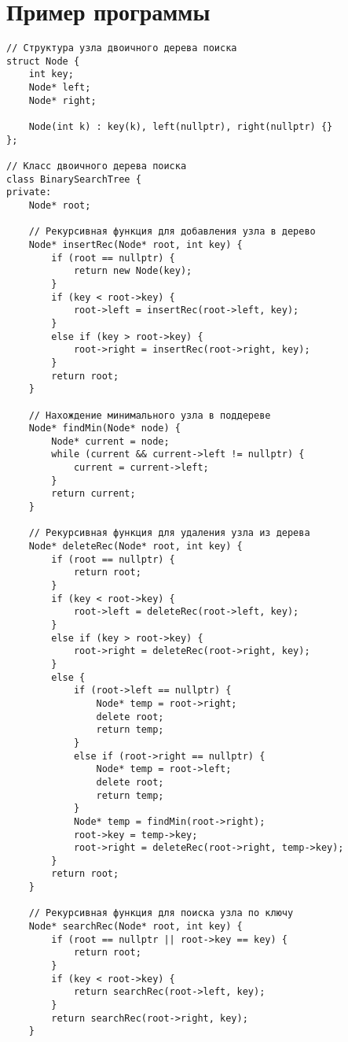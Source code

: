 \documentclass[otchet]{SCWorks}
\begin{document}
\section{Пример программы}
\begin{verbatim}
// Структура узла двоичного дерева поиска
struct Node {
    int key;
    Node* left;
    Node* right;

    Node(int k) : key(k), left(nullptr), right(nullptr) {}
};

// Класс двоичного дерева поиска
class BinarySearchTree {
private:
    Node* root;

    // Рекурсивная функция для добавления узла в дерево
    Node* insertRec(Node* root, int key) {
        if (root == nullptr) {
            return new Node(key);
        }
        if (key < root->key) {
            root->left = insertRec(root->left, key);
        }
        else if (key > root->key) {
            root->right = insertRec(root->right, key);
        }
        return root;
    }

    // Нахождение минимального узла в поддереве
    Node* findMin(Node* node) {
        Node* current = node;
        while (current && current->left != nullptr) {
            current = current->left;
        }
        return current;
    }

    // Рекурсивная функция для удаления узла из дерева
    Node* deleteRec(Node* root, int key) {
        if (root == nullptr) {
            return root;
        }
        if (key < root->key) {
            root->left = deleteRec(root->left, key);
        }
        else if (key > root->key) {
            root->right = deleteRec(root->right, key);
        }
        else {
            if (root->left == nullptr) {
                Node* temp = root->right;
                delete root;
                return temp;
            }
            else if (root->right == nullptr) {
                Node* temp = root->left;
                delete root;
                return temp;
            }
            Node* temp = findMin(root->right);
            root->key = temp->key;
            root->right = deleteRec(root->right, temp->key);
        }
        return root;
    }

    // Рекурсивная функция для поиска узла по ключу
    Node* searchRec(Node* root, int key) {
        if (root == nullptr || root->key == key) {
            return root;
        }
        if (key < root->key) {
            return searchRec(root->left, key);
        }
        return searchRec(root->right, key);
    }


\end{verbatim}
\end{document}
